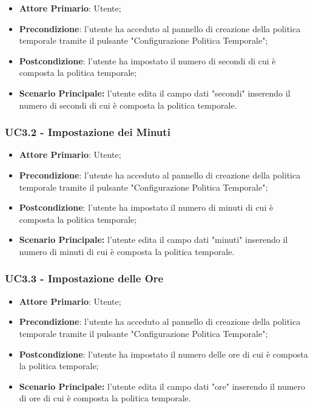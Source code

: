 \begin{itemize}
	\item \textbf{Attore Primario}: Utente;
	\item \textbf{Precondizione}: l'utente ha acceduto al pannello di creazione della politica temporale tramite il pulsante "Configurazione Politica Temporale";
	\item \textbf{Postcondizione}: l'utente ha impostato il numero di secondi di cui è composta la politica temporale;
	\item \textbf{Scenario Principale:} l'utente edita il campo dati "secondi" inserendo il numero di secondi di cui è composta la politica temporale.
\end{itemize}

\subsubsection{UC3.2 - Impostazione dei Minuti}\label{UC3.2}

\begin{itemize}
	\item \textbf{Attore Primario}: Utente;
	\item \textbf{Precondizione}: l'utente ha acceduto al pannello di creazione della politica temporale tramite il pulsante "Configurazione Politica Temporale";
	\item \textbf{Postcondizione}: l'utente ha impostato il numero di minuti di cui è composta la politica temporale;
	\item \textbf{Scenario Principale:} l'utente edita il campo dati "minuti" inserendo il numero di minuti di cui è composta la politica temporale.
\end{itemize}


\subsubsection{UC3.3 - Impostazione delle Ore}\label{UC3.3}

\begin{itemize}
	\item \textbf{Attore Primario}: Utente;
	\item \textbf{Precondizione}: l'utente ha acceduto al pannello di creazione della politica temporale tramite il pulsante "Configurazione Politica Temporale";
	\item \textbf{Postcondizione}: l'utente ha impostato il numero delle ore di cui è composta la politica temporale;
	\item \textbf{Scenario Principale:} l'utente edita il campo dati "ore" inserendo il numero di ore di cui è composta la politica temporale.
\end{itemize}



